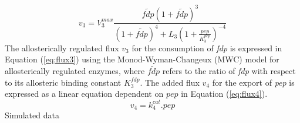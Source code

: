 \documentclass[10pt]{report}
\begin{document}
	\begin{equation}\label{eq:flux3}
	v_3 = V_{3}^{max}\frac{\tilde{fdp}\left(1+\tilde{fdp}\right)^3}{\left(1+\tilde{fdp}\right)^4+L_3\left(1+\frac{pep}{K_{3}^{pep}}\right)^{-4}}
	\end{equation}
	The allosterically regulated flux $v_3$ for the consumption of \textit{fdp} is expressed in Equation (\ref{eq:flux3}) using the Monod-Wyman-Changeux (MWC) model for allosterically regulated enzymes, where $\tilde{fdp}$ refers to the ratio of \textit{fdp} with respect to its allosteric binding constant $K_{3}^{fdp}$. The added flux $v_4$ for the export of \textit{pep} is expressed as a linear equation dependent on $pep$ in Equation (\ref{eq:flux4}).
	\begin{equation}\label{eq:flux4}
	v_4 = k_{4}^{cat}.pep
	\end{equation}
	Simulated data 
\end{document}
